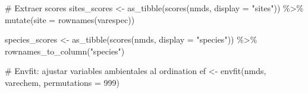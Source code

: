 \documentclass[
  spanish,
  11pt,
  a4paper,
  DIV=11,
  numbers=noendperiod]{scrartcl}
\newenvironment{Shaded}{\begin{snugshade}}{\end{snugshade}}
\newcommand{\AttributeTok}[1]{\textcolor[rgb]{0.40,0.45,0.13}{#1}}
\newcommand{\CommentTok}[1]{\textcolor[rgb]{0.37,0.37,0.37}{#1}}
\newcommand{\DecValTok}[1]{\textcolor[rgb]{0.68,0.00,0.00}{#1}}
\newcommand{\FunctionTok}[1]{\textcolor[rgb]{0.28,0.35,0.67}{#1}}
\newcommand{\NormalTok}[1]{\textcolor[rgb]{0.00,0.23,0.31}{#1}}
\newcommand{\OtherTok}[1]{\textcolor[rgb]{0.00,0.23,0.31}{#1}}
\newcommand{\SpecialCharTok}[1]{\textcolor[rgb]{0.37,0.37,0.37}{#1}}
\newcommand{\StringTok}[1]{\textcolor[rgb]{0.13,0.47,0.30}{#1}}
\begin{document}
\begin{Shaded}
\begin{Highlighting}[numbers=left,,]
\CommentTok{\# Extraer scores}
\NormalTok{sites\_scores }\OtherTok{\textless{}{-}} \FunctionTok{as\_tibble}\NormalTok{(}\FunctionTok{scores}\NormalTok{(nmds, }\AttributeTok{display =} \StringTok{"sites"}\NormalTok{)) }\SpecialCharTok{\%\textgreater{}\%}
  \FunctionTok{mutate}\NormalTok{(}\AttributeTok{site =} \FunctionTok{rownames}\NormalTok{(varespec))}

\NormalTok{species\_scores }\OtherTok{\textless{}{-}} \FunctionTok{as\_tibble}\NormalTok{(}\FunctionTok{scores}\NormalTok{(nmds, }\AttributeTok{display =} \StringTok{"species"}\NormalTok{)) }\SpecialCharTok{\%\textgreater{}\%}
  \FunctionTok{rownames\_to\_column}\NormalTok{(}\StringTok{"species"}\NormalTok{)}

\CommentTok{\# Envfit: ajustar variables ambientales al ordination}
\NormalTok{ef }\OtherTok{\textless{}{-}} \FunctionTok{envfit}\NormalTok{(nmds, varechem, }\AttributeTok{permutations =} \DecValTok{999}\NormalTok{)}


\end{Highlighting}
\end{Shaded}
\end{document}
